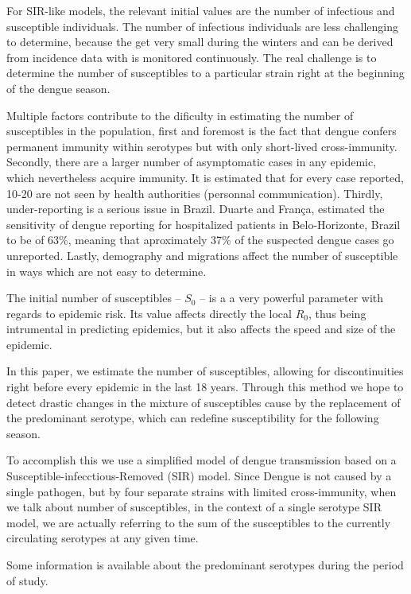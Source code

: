 For SIR-like models, the relevant initial values are the number of infectious 
and susceptible  individuals. 
The number of infectious individuals are less challenging to determine, because 
the get very small during the winters and can be derived from incidence data  
with is monitored continuously.
The real challenge is to determine the number of susceptibles to 
a particular strain right at the beginning of the dengue season.

Multiple factors contribute to the dificulty in estimating the number of 
susceptibles in the population, first and foremost is the fact that dengue
confers permanent immunity within serotypes but with only short-lived 
cross-immunity. 
Secondly, there are a larger number of asymptomatic cases in 
any epidemic, which nevertheless acquire immunity. It is estimated that for 
every case reported, 10-20 are not seen by health authorities (personnal 
communication).
Thirdly, under-reporting is a serious issue in Brazil. 
Duarte and Fran\c{c}a\cite{duarte_data_2006}, estimated 
the sensitivity of dengue reporting for hospitalized patients in 
Belo-Horizonte, Brazil to be of 63\%, 
meaning that aproximately 37\% of the suspected dengue cases go unreported.  
Lastly, demography and migrations affect the number of susceptible in ways which 
are not easy to determine.

The initial number of susceptibles -- $S_0$ -- is a a very powerful parameter 
with regards to epidemic risk.
Its value affects directly the local $R_0$, thus being intrumental in predicting 
epidemics, but it also affects the speed and size of the epidemic.

In this paper, we estimate the number of susceptibles, allowing for 
discontinuities right before every epidemic in the last 18 years. 
Through this method we hope to detect drastic changes in the mixture of 
susceptibles cause by the replacement of the predominant serotype, which 
can redefine susceptibility for the following season.

To accomplish this we use a simplified model of 
dengue transmission based on a Susceptible-infecctious-Removed (SIR) model. 
Since Dengue is not caused by a single pathogen, but by four separate strains 
with limited cross-immunity, when we talk about number of susceptibles, in the 
context of a single serotype SIR model, we are actually referring to the sum of 
the susceptibles to the currently circulating serotypes at any given time. 

Some information is available about the predominant serotypes during the 
period of study\cite{macedo_virological_2013}. 

